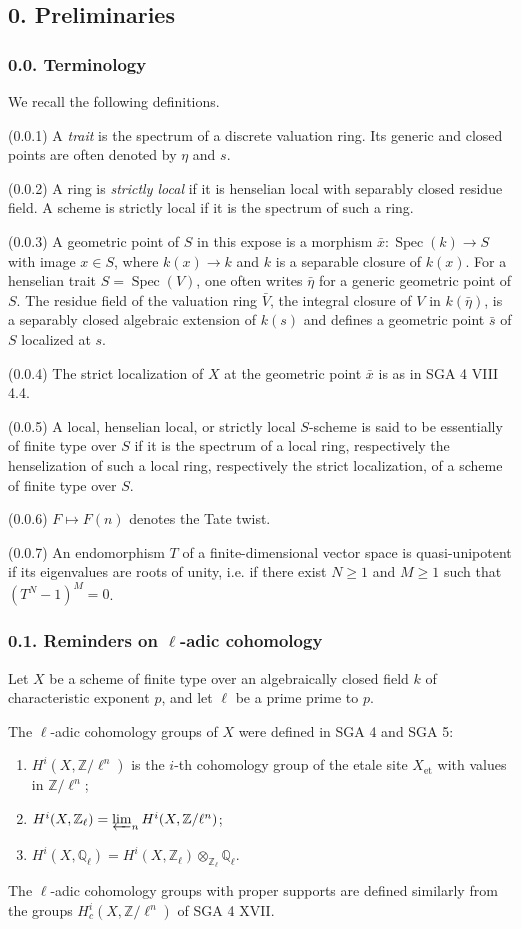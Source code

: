 \documentclass[11pt]{article}
\providecommand{\Spec}{\operatorname{Spec}}
\providecommand{\Z}{\mathbb Z}
\providecommand{\Ql}{\mathbb Q_\ell}
\providecommand{\Zl}{\mathbb Z_\ell}
\providecommand{\et}{\mathrm{et}}
\providecommand{\limproj}{\varprojlim}
\begin{document}
\subsection*{0. Preliminaries}
\subsubsection*{0.0. Terminology}
We recall the following definitions.

(0.0.1) A \emph{trait} is the spectrum of a discrete valuation ring. Its generic and closed points are often denoted by $\eta$ and $s$.

(0.0.2) A ring is \emph{strictly local} if it is henselian local with separably closed residue field. A scheme is strictly local if it is the spectrum of such a ring.

(0.0.3) A geometric point of $S$ in this expose is a morphism $\bar x:\Spec(k)\to S$ with image $x\in S$, where $k(x)\to k$ and $k$ is a separable closure of $k(x)$. For a henselian trait $S=\Spec(V)$, one often writes $\bar\eta$ for a generic geometric point of $S$. The residue field of the valuation ring $\bar V$, the integral closure of $V$ in $k(\bar\eta)$, is a separably closed algebraic extension of $k(s)$ and defines a geometric point $\bar s$ of $S$ localized at $s$.

(0.0.4) The strict localization of $X$ at the geometric point $\bar x$ is as in SGA 4 VIII 4.4.

(0.0.5) A local, henselian local, or strictly local $S$-scheme is said to be essentially of finite type over $S$ if it is the spectrum of a local ring, respectively the henselization of such a local ring, respectively the strict localization, of a scheme of finite type over $S$.

(0.0.6) $F\mapsto F(n)$ denotes the Tate twist.

(0.0.7) An endomorphism $T$ of a finite-dimensional vector space is quasi-unipotent if its eigenvalues are roots of unity, i.e. if there exist $N\geq1$ and $M\geq1$ such that $(T^N-1)^M=0$.

\subsubsection*{0.1. Reminders on $\ell$-adic cohomology}
Let $X$ be a scheme of finite type over an algebraically closed field $k$ of characteristic exponent $p$, and let $\ell$ be a prime prime to $p$.

The $\ell$-adic cohomology groups of $X$ were defined in SGA 4 and SGA 5:
\begin{enumerate}[label=\alph*)]
\item $H^i(X,\Z/\ell^n)$ is the $i$-th cohomology group of the etale site $X_{\et}$ with values in $\Z/\ell^n$;
\item $H^i(X,\Zl)=\limproj_n H^i(X,\Z/\ell^n)$;
\item $H^i(X,\Ql)=H^i(X,\Zl)\otimes_{\Zl}\Ql$.
\end{enumerate}
The $\ell$-adic cohomology groups with proper supports are defined similarly from the groups $H_c^i(X,\Z/\ell^n)$ of SGA 4 XVII.
\end{document}
